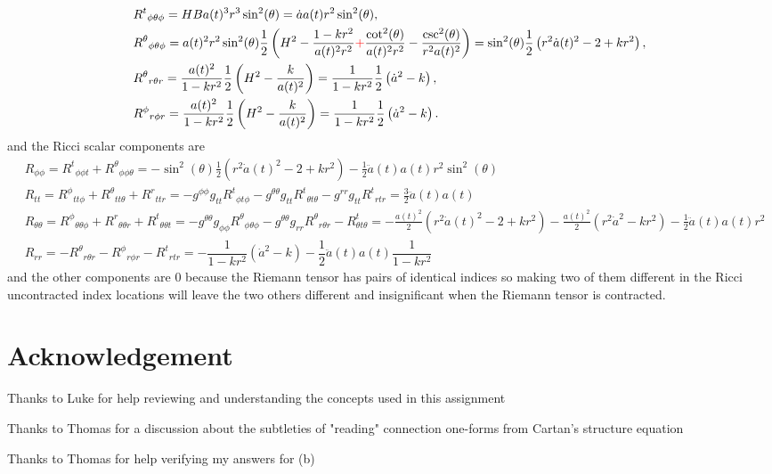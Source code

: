 \documentclass[10pt, a4paper]{article}
\begin{document}
{\begin{enumerate}
\begin{align*}
    &R^{t}{}_{\phi \theta \phi} = HB a(t)^3 r^3 \sin^2(\theta) =  \dot{a} a(t) r^2 \sin^2(\theta),\\
    &R^{\theta}{}_{\phi \theta \phi} = a(t)^2 r^2 \sin^2(\theta) \frac{1}{2}\left(H^2-\dfrac{1-kr^2}{a(t)^2 r^2} \textcolor{red}{+} \dfrac{\cot^2(\theta)}{a(t)^2 r^2} -\frac{\csc^2(\theta)}{r^2 a(t)^2}\right) = \sin^2(\theta) \frac{1}{2}\left(r^2 \dot{a}(t)^2- 2 + kr^2\right),\\
    &R^{\theta}{}_{r \theta r} = \dfrac{a(t)^2}{1-kr^2}\frac{1}{2}\left(H^2-\frac{k}{a(t)^2}\right) = \dfrac{1}{1-kr^2}\frac{1}{2}\left(\dot{a}^2-k\right),\\
    &R^{\phi}{}_{r \phi r} = \dfrac{a(t)^2}{1-kr^2}\frac{1}{2}\left(H^2-\frac{k}{a(t)^2}\right) = \dfrac{1}{1-kr^2}\frac{1}{2}\left(\dot{a}^2-k\right).
  \end{align*} 
  and the Ricci scalar components are 
  \begin{align*}
    &R_{\phi \phi} = R^{t}{}_{\phi \phi t} + R^{\theta}{}_{\phi \phi \theta} = -\sin^2(\theta) \frac{1}{2}\left(r^2 \dot{a}(t)^2- 2 + kr^2\right) -\frac{1}{2}\ddot{a}(t) a(t) r^2 \sin^2(\theta)\\
    &R_{tt} = R^{\phi}{}_{t t\phi} + R^{\theta}{}_{t t\theta} + R^{r}{}_{t t r} = -g^{\phi\phi} g_{tt} R^{t}{}_{\phi t\phi} -g^{\theta\theta} g_{tt} R^{t}{}_{\theta t\theta} -  g^{rr}g_{tt}R^{t}{}_{r t r} = \frac{3}{2} \ddot{a}(t) a(t)\\
    &R_{\theta\theta} = R^{\phi}{}_{\theta \theta \phi} + R^{r}{}_{\theta \theta r} + R^{t}{}_{\theta \theta t} = - g^{\theta \theta} g_{\phi\phi}  R^{\theta}{}_{\phi \theta \phi} -g^{\theta \theta} g_{rr}  R^{\theta}{}_{r \theta r} - R^{t}_{\theta t \theta} = -\frac{a(t)^2}{2}\left(r^2 \dot{a}(t)^2 - 2 + kr^2\right) - \frac{a(t)^2}{2}\left(r^2\dot{a}^2- k r^2\right) - \frac{1}{2}\ddot{a}(t) a(t) r^2\\
    &R_{rr} = -R^{\theta}{}_{r \theta r} - R^{\phi}{}_{r \phi r} - R^{t}{}_{rtr} = -\dfrac{1}{1-kr^2}\left(\dot{a}^2-k\right) - \dfrac{1}{2}\ddot{a}(t) a(t) \dfrac{1}{1-kr^2}
  \end{align*}
  and the other components are $0$ because the Riemann tensor has pairs of identical indices so making two of them different in the Ricci uncontracted index locations will leave the two others different and insignificant when the Riemann tensor is contracted.
\end{enumerate}

\section{Acknowledgement}

Thanks to Luke for help reviewing and understanding the concepts used in this assignment

Thanks to Thomas for a discussion about the subtleties of "reading" connection one-forms from Cartan's structure equation

Thanks to Thomas for help verifying my answers for (b)


}

\makereferences


\end{document}
